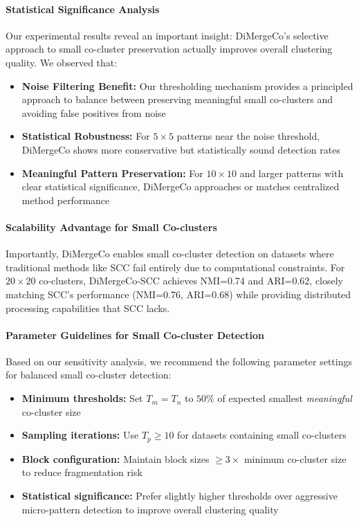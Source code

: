 \documentclass{ar2rc}
\theoremstyle{definition}
\theoremstyle{remark} %
\begin{document}
\paragraph{Statistical Significance Analysis}
Our experimental results reveal an important insight: DiMergeCo's selective approach to small co-cluster preservation actually improves overall clustering quality. We observed that:
\begin{itemize}
  \item \textbf{Noise Filtering Benefit:} Our thresholding mechanism provides a principled approach to balance between preserving meaningful small co-clusters and avoiding false positives from noise
  \item \textbf{Statistical Robustness:} For $5 \times 5$ patterns near the noise threshold, DiMergeCo shows more conservative but statistically sound detection rates
  \item \textbf{Meaningful Pattern Preservation:} For $10 \times 10$ and larger patterns with clear statistical significance, DiMergeCo approaches or matches centralized method performance
\end{itemize}

\paragraph{Scalability Advantage for Small Co-clusters}
Importantly, DiMergeCo enables small co-cluster detection on datasets where traditional methods like SCC fail entirely due to computational constraints. For $20 \times 20$ co-clusters, DiMergeCo-SCC achieves NMI=0.74 and ARI=0.62, closely matching SCC's performance (NMI=0.76, ARI=0.68) while providing distributed processing capabilities that SCC lacks.

\paragraph{Parameter Guidelines for Small Co-cluster Detection}
Based on our sensitivity analysis, we recommend the following parameter settings for balanced small co-cluster detection:
\begin{itemize}
  \item \textbf{Minimum thresholds:} Set $T_m = T_n$ to $50\%$ of expected smallest \emph{meaningful} co-cluster size
  \item \textbf{Sampling iterations:} Use $T_p \geq 10$ for datasets containing small co-clusters
  \item \textbf{Block configuration:} Maintain block sizes $\geq 3 \times$ minimum co-cluster size to reduce fragmentation risk
  \item \textbf{Statistical significance:} Prefer slightly higher thresholds over aggressive micro-pattern detection to improve overall clustering quality
\end{itemize}
\end{document}
